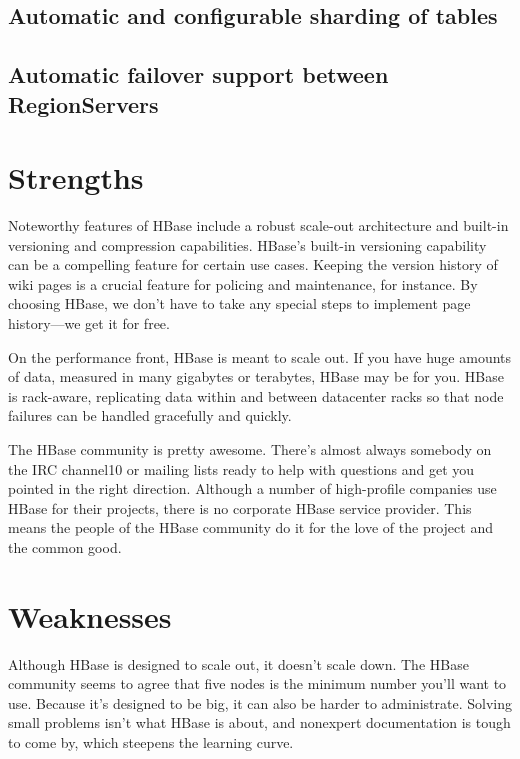 \subsection{Automatic and configurable sharding of tables}

\subsection{Automatic failover support between RegionServers}

\section{Strengths}

Noteworthy features of HBase include a robust scale-out architecture and built-in versioning and compression capabilities. HBase's built-in versioning capability can be a compelling feature for certain use cases. Keeping the version history of wiki pages is a crucial feature for policing and maintenance, for instance. By choosing HBase, we don’t have to take any special steps to implement page history—we get it for free.

On the performance front, HBase is meant to scale out. If you have huge amounts of data, measured in many gigabytes or terabytes, HBase may be for you. HBase is rack-aware, replicating data within and between datacenter racks so that node failures can be handled gracefully and quickly.

The HBase community is pretty awesome. There's almost always somebody on the IRC channel10 or mailing lists ready to help with questions and get you pointed in the right direction. Although a number of high-profile companies use HBase for their projects, there is no corporate HBase service provider. This means the people of the HBase community do it for the love of the project and the common good.\cite{seven_databases}

\section{Weaknesses}

Although HBase is designed to scale out, it doesn't scale down. The HBase community seems to agree that five nodes is the minimum number you'll want to use. Because it's designed to be big, it can also be harder to administrate. Solving small problems isn't what HBase is about, and nonexpert documentation is tough to come by, which steepens the learning curve.

